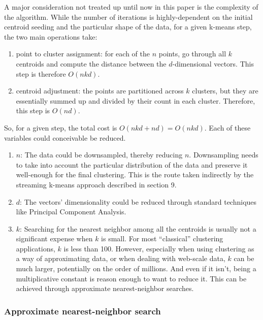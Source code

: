 \documentclass{article}
\begin{document}
A major consideration not treated up until now in this paper is the complexity of
the algorithm. While the number of iterations is highly-dependent on the
initial centroid seeding and the particular shape of the data, for a given
k-means step, the two main operations take:
\begin{enumerate}
    \item point to cluster assignment: for each of the $n$ points, go through
        all $k$ centroids and compute the distance between the $d$-dimensional
        vectors. This step is therefore $O(n k d)$.
    \item centroid adjustment: the points are partitioned across $k$ clusters,
        but they are essentially summed up and divided by their count in each
        cluster. Therefore, this step is $O(n d)$.
\end{enumerate}

So, for a given step, the total cost is $O(n k d + nd) = O(n k d)$. Each of
these variables could conceivable be reduced.

\begin{enumerate}
    \item $n$: The data could be downsampled, thereby reducing
        $n$.  Downsampling needs to take into account the particular distribution 
        of the data and preserve it well-enough for
        the final clustering. This is the route taken indirectly by the
        streaming k-means approach described in section 9.
    \item $d$: The vectors' dimensionality could be reduced through standard
        techniques like Principal Component Analysis.
    \item $k$: Searching for the nearest neighbor among all the centroids is
        usually not a significant expense when $k$ is small. For most
        ``classical'' clustering applications, $k$ is less than 100. However,
        especially when using clustering as a way of approximating data, or
        when dealing with web-scale data, $k$ can be much larger, potentially
        on the order of millions. And even if it isn't, being a multiplicative
        constant is reason enough to want to reduce it.
        This can be achieved through approximate nearest-neighbor searches.
\end{enumerate}

\subsubsection{Approximate nearest-neighbor search}
\end{document}
